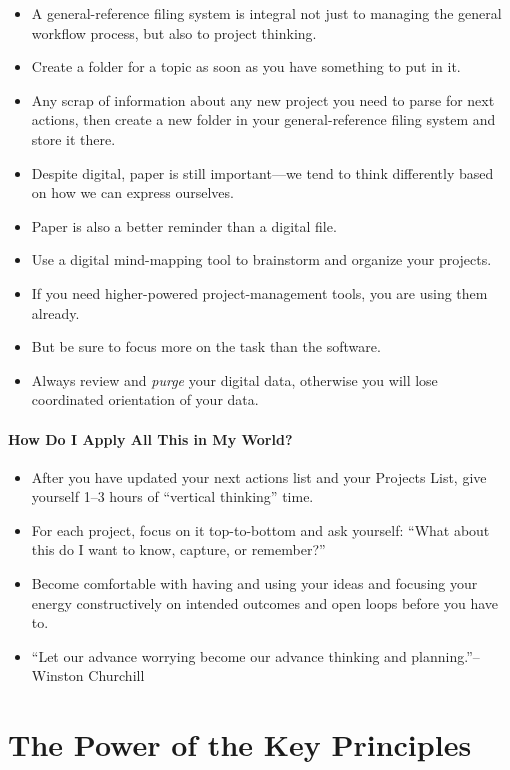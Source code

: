 \documentclass{article}
\begin{document}
\begin{itemize}
 \item A general-reference filing system is integral not just to managing the general workflow process, but also to project thinking.
 \item Create a folder for a topic as soon as you have something to put in it.
 \item Any scrap of information about any new project you need to parse for next actions, then create a new folder in your general-reference filing system and store it there.
 \item Despite digital, paper is still important---we tend to think differently based on how we can express ourselves.
 \item Paper is also a better reminder than a digital file.
 \item Use a digital mind-mapping tool to brainstorm and organize your projects.
 \item If you need higher-powered project-management tools, you are using them already.
 \item But be sure to focus more on the task than the software.
 \item Always review and \emph{purge} your digital data, otherwise you will lose coordinated orientation of your data.
\end{itemize}

\paragraph{How Do I Apply All This in My World?}

\begin{itemize}
 \item After you have updated your next actions list and your Projects List, give yourself 1--3 hours of ``vertical thinking'' time.
 \item For each project, focus on it top-to-bottom and ask yourself: ``What about this do I want to know, capture, or remember?''
 \item Become comfortable with having and using your ideas and focusing your energy constructively on intended outcomes and open loops before you have to.
 \item ``Let our advance worrying become our advance thinking and planning.''--Winston Churchill
\end{itemize}

\section{The Power of the Key Principles}
\end{document}

